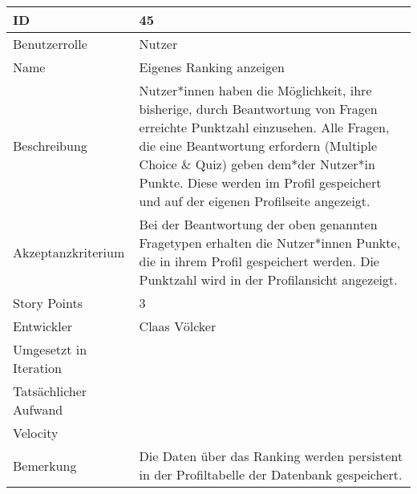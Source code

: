 \begin{tabularx}{\textwidth}{|p{}|X|}
	\hline
	ID & 45\\
	\hline
	Benutzerrolle & Nutzer\\
	\hline
	Name & Eigenes Ranking anzeigen\\
	\hline
	Beschreibung & Nutzer*innen haben die Möglichkeit, ihre bisherige, durch Beantwortung von Fragen erreichte Punktzahl einzusehen. Alle Fragen, die eine Beantwortung erfordern (Multiple Choice \& Quiz) geben dem*der Nutzer*in Punkte. Diese werden im Profil gespeichert und auf der eigenen Profilseite angezeigt.\\
	\hline
	Akzeptanzkriterium & Bei der Beantwortung der oben genannten Fragetypen erhalten die Nutzer*innen Punkte, die in ihrem Profil gespeichert werden. Die Punktzahl wird in der Profilansicht angezeigt.\\
	\hline
	Story Points & 3\\
	\hline
	Entwickler & Claas Völcker\\
	\hline
	Umgesetzt in Iteration & \\ 
	\hline
	Tatsächlicher Aufwand & \\
	\hline
	Velocity & \\
	\hline
	Bemerkung & Die Daten über das Ranking werden persistent in der Profiltabelle der Datenbank gespeichert.\\
	\hline
\end{tabularx}
\vspace{20pt}
